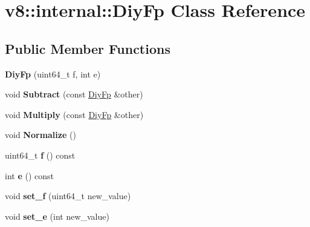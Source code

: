 \hypertarget{classv8_1_1internal_1_1_diy_fp}{}\section{v8\+:\+:internal\+:\+:Diy\+Fp Class Reference}
\label{classv8_1_1internal_1_1_diy_fp}
\subsection*{Public Member Functions}
\begin{DoxyCompactItemize}
\item 
{\bfseries Diy\+Fp} (uint64\+\_\+t f, int e)\hypertarget{classv8_1_1internal_1_1_diy_fp_a706c119a6d9aa35dcf0781f2e2a283a0}{}\label{classv8_1_1internal_1_1_diy_fp_a706c119a6d9aa35dcf0781f2e2a283a0}

\item 
void {\bfseries Subtract} (const \hyperlink{classv8_1_1internal_1_1_diy_fp}{Diy\+Fp} \&other)\hypertarget{classv8_1_1internal_1_1_diy_fp_ad59641acca06e61296ab5b9436bcbe85}{}\label{classv8_1_1internal_1_1_diy_fp_ad59641acca06e61296ab5b9436bcbe85}

\item 
void {\bfseries Multiply} (const \hyperlink{classv8_1_1internal_1_1_diy_fp}{Diy\+Fp} \&other)\hypertarget{classv8_1_1internal_1_1_diy_fp_a50c7369cc4e9d7e9c3add0f7a4818645}{}\label{classv8_1_1internal_1_1_diy_fp_a50c7369cc4e9d7e9c3add0f7a4818645}

\item 
void {\bfseries Normalize} ()\hypertarget{classv8_1_1internal_1_1_diy_fp_a39ba5a89a07fe9feaa4de5695da55310}{}\label{classv8_1_1internal_1_1_diy_fp_a39ba5a89a07fe9feaa4de5695da55310}

\item 
uint64\+\_\+t {\bfseries f} () const \hypertarget{classv8_1_1internal_1_1_diy_fp_aa67842c9f9223032303d8088436027bd}{}\label{classv8_1_1internal_1_1_diy_fp_aa67842c9f9223032303d8088436027bd}

\item 
int {\bfseries e} () const \hypertarget{classv8_1_1internal_1_1_diy_fp_a8812342f7d608411992e55fd6f51c84e}{}\label{classv8_1_1internal_1_1_diy_fp_a8812342f7d608411992e55fd6f51c84e}

\item 
void {\bfseries set\+\_\+f} (uint64\+\_\+t new\+\_\+value)\hypertarget{classv8_1_1internal_1_1_diy_fp_a95098aea05a2339189be1547512423e1}{}\label{classv8_1_1internal_1_1_diy_fp_a95098aea05a2339189be1547512423e1}

\item 
void {\bfseries set\+\_\+e} (int new\+\_\+value)\hypertarget{classv8_1_1internal_1_1_diy_fp_a64c435e55ebd3bfd48b1a5b00d9be055}{}\label{classv8_1_1internal_1_1_diy_fp_a64c435e55ebd3bfd48b1a5b00d9be055}

\end{DoxyCompactItemize}

